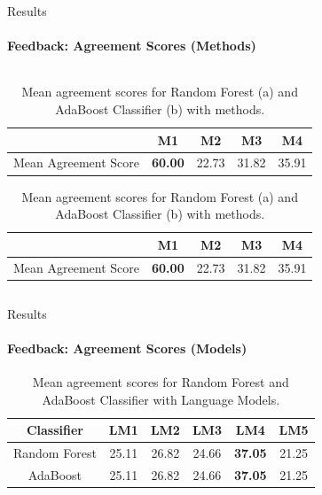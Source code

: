 \documentclass[aspectratio=169]{beamer}
\begin{document}
\begin{frame}{Results}
	\framesubtitle{Feedback: Agreement Scores (Methods)}
	\begin{columns}
		\begin{column}{1\textwidth}
	\begin{table}
		\begin{subtable}[c]{0.5\textwidth}
			\centering
			\begin{tabular}{|c|c|c|c|c|}
				\hline
				 & M1 & M2 & M3 & M4 \\
				\hline
				Mean Agreement Score &\textbf{60.00}&22.73&31.82&35.91\\
				\hline
			\end{tabular}
			\subcaption{}
		\end{subtable}
		\begin{subtable}[c]{0.5\textwidth}
			\centering
			\begin{tabular}{|c|c|c|c|c|}
				\hline
				& M1 & M2 & M3 & M4 \\
				\hline
				Mean Agreement Score &\textbf{60.00}&22.73&31.82&35.91\\
				\hline
			\end{tabular}
			\subcaption{}
		\end{subtable}
		\caption{Mean agreement scores for Random Forest (a) and AdaBoost Classifier (b) with methods.}
	\end{table}
\end{column}
\end{columns}
\end{frame}
\begin{frame}{Results}
	\framesubtitle{Feedback: Agreement Scores (Models)}
	\begin{table}
			\centering
			\begin{tabular}{|c|c|c|c|c|c|}
			\hline
			Classifier & LM1 & LM2 & LM3 & LM4 & LM5 \\
			\hline
			Random Forest &25.11& 26.82& 24.66& \textbf{37.05}& 21.25\\
			\hline
			AdaBoost &25.11& 26.82& 24.66& \textbf{37.05}& 21.25\\
			\hline
			\end{tabular}
		\caption{Mean agreement scores for Random Forest and AdaBoost Classifier with Language Models.}
	\end{table}
	
\end{frame}
\end{document}
